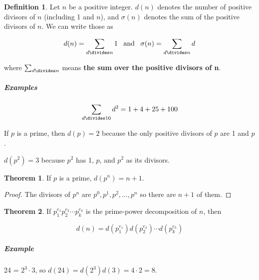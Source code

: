 \documentclass{article}
\theoremstyle{definition} %
\newtheorem{theorem}{Theorem}[section] %
\theoremstyle{definition}
\theoremstyle{definition}
\theoremstyle{definition}
\newtheorem{definition}{Definition}[section]
\begin{document}
  \begin{definition}
    Let $n$ be a positive integer. $d(n)$ denotes the number of positive divisors of $n$
    (including 1 and $n$), and $\sigma(n)$ denotes the sum of the positive divisors of $n$.
    We can write those as
    
    \[ d(n)=\sum_{d \divides n} 1 \;\;\;\text{and}\;\;\; \sigma(n) = \sum_{d \divides n} d \]
    
    where $\sum_{d \divides n}$ means \textbf{the sum over the positive divisors of n}.
  \end{definition}
  
  \subparagraph{Examples}
  
  \[ \sum_{d \divides 10}d^2 = 1 + 4 + 25 + 100 \]
  
  If $p$ is a prime, then $d(p) = 2$ because the only positive divisors of $p$ are 1 and $p$.
  
  $d(p^2) = 3$ because $p^2$ has 1, $p$, and $p^2$ as its divisors.
  
  \begin{theorem}
    If $p$ is a prime, $d(p^n) = n + 1$.
  \end{theorem}
  
  \begin{proof}
    The divisors of $p^n$ are $p^0, p^1, p^2, \dots, p^n$ so there are $n + 1$ of them.
  \end{proof}
  
  \begin{theorem}
    \label{th:divisor_count_formula}
    If $p_1^{e_1}p_2^{e_2}\cdots p_k^{e_k}$ is the prime-power decomposition of $n$, then
    
    \[ d(n) = d(p_1^{e_1})d(p_2^{e_2})\cdots d(p_k^{e_k}) \]
  \end{theorem}
  
  \subparagraph{Example} 24 = $2^3 \cdot 3$, so $d(24) = d(2^3)d(3) = 4 \cdot 2 = 8$.
  
\end{document}
